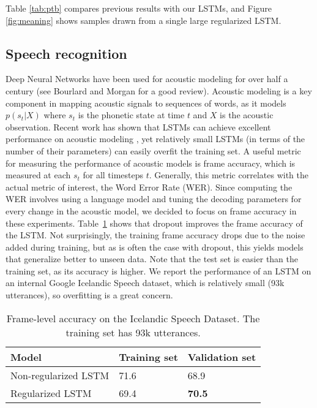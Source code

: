 \documentclass{article} %
\begin{document}
	Table \ref{tab:ptb} compares previous results with our LSTMs, and
	Figure \ref{fig:meaning} shows samples drawn from a single large 
	regularized LSTM.
	
	
	\subsection{Speech recognition}
	\label{sec:speech}
	
	Deep Neural Networks have been used for acoustic modeling for over half a century (see
	Bourlard and Morgan \cite{BourlardASR} for a good review). Acoustic modeling is a key
	component in mapping acoustic signals to sequences of words, as it
	models $p(s_t|X)$ where $s_t$ is the phonetic state at time $t$ and $X$
	is the acoustic observation. Recent work has shown that LSTMs can 
	achieve excellent performance on acoustic modeling \cite{sak2014speech}, yet
	relatively small LSTMs (in terms of the number of their parameters) can
	easily overfit the training set. A useful metric for measuring the performance of acoustic models is frame
	accuracy, which is measured at each $s_t$ for all timesteps
	$t$. Generally, this metric correlates with the actual metric of
	interest, the Word Error Rate (WER). Since computing the WER
	involves using a language model and tuning the decoding parameters for
	every change in the acoustic model, we decided to focus on frame
	accuracy in these experiments. Table~\ref{tab:speech} shows
	that dropout improves the frame accuracy of the LSTM. Not
	surprisingly, the training frame accuracy drops due to the noise added
	during training, but as is often the case with dropout, this yields
	models that generalize better to unseen data. Note that the test
	set is easier than the training set, as its accuracy is higher.  We
	report the performance of an LSTM on an internal Google Icelandic
	Speech dataset, which is relatively small (93k utterances), so
	overfitting is a great concern.
	
	\begin{table}[t]
		\small
		\centering
		\renewcommand{\arraystretch}{1.15}
		\begin{tabular}{lll}
			\hline
			Model & Training set & Validation set \\
			\hline
			Non-regularized LSTM & 71.6 & 68.9 \\
			Regularized LSTM & 69.4 & {\bf 70.5} \\
			\hline
		\end{tabular}
		\caption{Frame-level accuracy on the Icelandic Speech Dataset. The training set has 93k utterances.}
		\label{tab:speech}
	\end{table}
	
\end{document}
